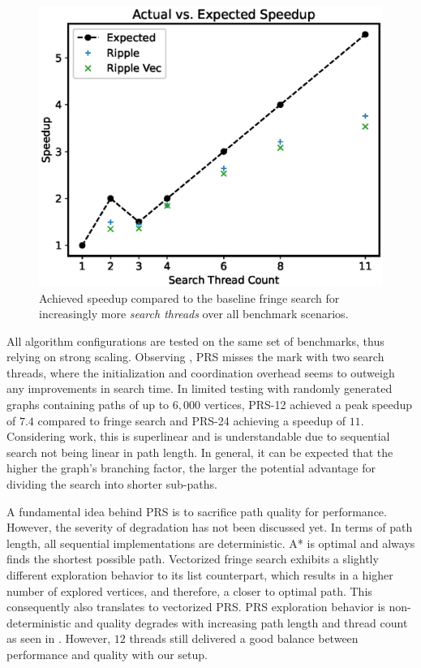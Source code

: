 \begin{figure}[H]
    \centering
    \includegraphics[width=\linewidth]{img/speedup.eps}
    \caption{Achieved speedup compared to the baseline fringe search for increasingly more \textit{search threads} over all benchmark scenarios.}
    \label{fig:speedup}
\end{figure}

\noindent All algorithm configurations are tested on the same set of benchmarks, thus relying on strong scaling. 
Observing , PRS misses the mark with two search threads, where the initialization and coordination overhead seems to outweigh any improvements in search time.
In limited testing with randomly generated graphs containing paths of up to $6,000$ vertices, PRS-12 achieved a peak speedup of $7.4$ compared to fringe search and PRS-24 achieving a speedup of $11$. 
Considering work, this is superlinear and is understandable due to sequential search not being linear in path length. 
In general, it can be expected that the higher the graph's branching factor, the larger the potential advantage for dividing the search into shorter sub-paths.

A fundamental idea behind PRS is to sacrifice path quality for performance. However, the severity of degradation has not been discussed yet.
In terms of path length, all sequential implementations are deterministic. A* is optimal and always finds the shortest possible path.
Vectorized fringe search exhibits a slightly different exploration behavior to its list counterpart, which results in a higher number of explored vertices, and therefore, a closer to optimal path. 
This consequently also translates to vectorized PRS.
PRS exploration behavior is non-deterministic and quality degrades with increasing path length and thread count as seen in .
However, $12$ threads still delivered a good balance between performance and quality with our setup.

